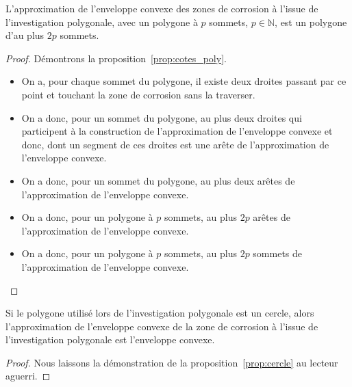 \documentclass[francais,RandD]{rapportPFE}
\begin{document}
				\begin{Proposition}
					L'approximation de l'enveloppe convexe des zones de corrosion à l'issue de l'investigation polygonale, avec un polygone à $p$ sommets, $p \in \mathbb{N}$, est un polygone d'au plus $2p$ sommets.
					\label{prop:cotes_poly}
				\end{Proposition}
				\begin{proof}
					Démontrons la proposition~\ref{prop:cotes_poly}.
					\begin{itemize}
						\item On a, pour chaque sommet du polygone, il existe deux droites passant par ce point et touchant la zone de corrosion sans la traverser.
						\item On a donc, pour un sommet du polygone, au plus deux droites qui participent à la construction de l'approximation de l'enveloppe convexe et donc, dont un segment de ces droites est une arête de l'approximation de l'enveloppe convexe.
						\item On a donc, pour un sommet du polygone, au plus deux arêtes de l'approximation de l'enveloppe convexe.
						\item On a donc, pour un polygone à $p$ sommets, au plus $2p$ arêtes de l'approximation de l'enveloppe convexe.
						\item On a donc, pour un polygone à $p$ sommets, au plus $2p$ sommets de l'approximation de l'enveloppe convexe.
					\end{itemize}
				\end{proof}

				\begin{Proposition}
					Si le polygone utilisé lors de l'investigation polygonale est un cercle, alors l'approximation de l'enveloppe convexe de la zone de corrosion à l'issue de l'investigation polygonale est l'enveloppe convexe.
					\label{prop:cercle}
				\end{Proposition}
				\begin{proof}
					Nous laissons la démonstration de la proposition~\ref{prop:cercle} au lecteur aguerri.
				\end{proof}
\end{document}
